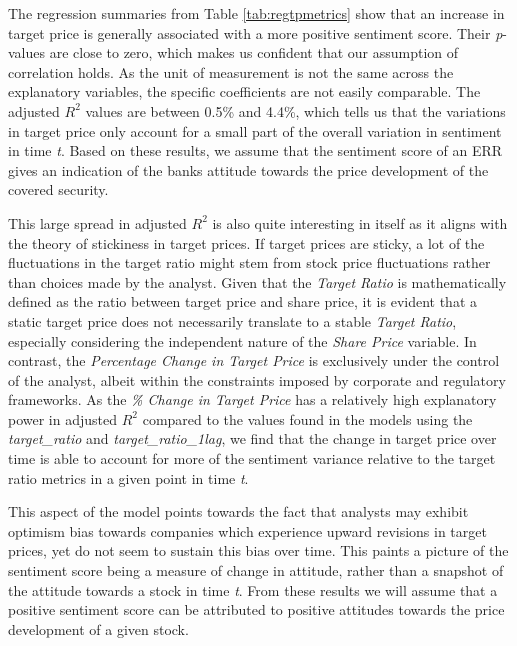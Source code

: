\clearpage

The regression summaries from Table \ref{tab:regtpmetrics} show that an increase in target price is generally associated with a more positive sentiment score. Their \textit{p}-values are close to zero, which makes us confident that our assumption of correlation holds. As the unit of measurement is not the same across the explanatory variables, the specific coefficients are not easily comparable. The adjusted \(R^2\) values are between 0.5\% and 4.4\%, which tells us that the variations in target price only account for a small part of the overall variation in sentiment in time \textit{t}. Based on these results, we assume that the sentiment score of an ERR gives an indication of the banks attitude towards the price development of the covered security.

This large spread in adjusted \(R^2\) is also quite interesting in itself as it aligns with the theory of stickiness \parencite{bouchaud2019sticky} in target prices. If target prices are sticky, a lot of the fluctuations in the target ratio might stem from stock price fluctuations rather than choices made by the analyst. Given that the \textit{Target Ratio} is mathematically defined as the ratio between target price and share price, it is evident that a static target price does not necessarily translate to a stable \textit{Target Ratio}, especially considering the independent nature of the \textit{Share Price} variable. In contrast, the \textit{Percentage Change in Target Price} is exclusively under the control of the analyst, albeit within the constraints imposed by corporate and regulatory frameworks. As the \textit{\% Change in Target Price} has a relatively high explanatory power in adjusted \(R^2\) compared to the values found in the models using the \textit{target\_ratio} and \textit{target\_ratio\_1lag}, we find that the change in target price over time is able to account for more of the sentiment variance relative to the target ratio metrics in a given point in time \textit{t}.

This aspect of the model points towards the fact that analysts may exhibit optimism bias towards companies which experience upward revisions in target prices, yet do not seem to sustain this bias over time. This paints a picture of the sentiment score being a measure of change in attitude, rather than a snapshot of the attitude towards a stock in time \textit{t}. From these results we will assume that a positive sentiment score can be attributed to positive attitudes towards the price development of a given stock.



